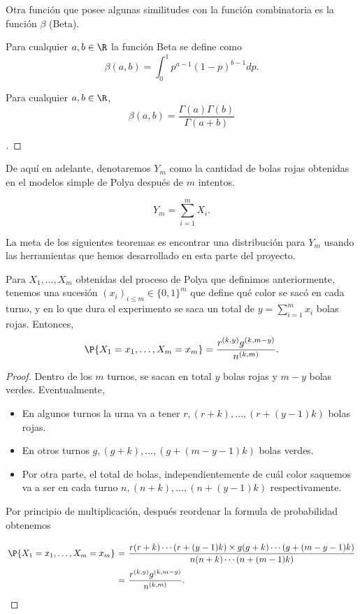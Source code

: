 Otra función que posee algunas similitudes con la función combinatoria es la función $\beta$ (Beta).

\begin{definition} Para cualquier $a,b \in \R$ la función Beta se define como
    \[ \beta(a,b) = \int_0^1 p^{a-1} (1-p)^{b-1} dp. \]
\end{definition}

\begin{theorem} Para cualquier $a,b \in \R$,
    \[ \beta(a,b) = \dfrac{\Gamma(a)\Gamma(b)}{\Gamma(a+b)} \]
\end{theorem}
\begin{proof}[]
    \vspace*{-2em}
\end{proof}

De aquí en adelante, denotaremos $Y_m$ como la cantidad de bolas rojas obtenidas en el modelos simple de Polya después de $m$ intentos.

\begin{definition}
    \[ Y_m = \sum_{i = 1}^{m} X_i. \]
\end{definition}

La meta de los siguientes teoremas es encontrar una distribución para $Y_m$ usando las herramientas que hemos desarrollado en esta parte del proyecto.

\begin{theorem}\label{polya-mass}
    Para $X_1,\ldots, X_m$ obtenidas del proceso de Polya que definimos anteriormente, tenemos una sucesión $(x_i)_{i\leq m} \in \{0,1\}^m$ que define qué color se sacó en cada turno, y en lo que dura el experimento se saca un total de $y = \sum_{i = 1}^m x_i$ bolas rojas. Entonces,
    \[  \P\{X_1 = x_1,\ldots, X_m = x_m\} = \frac{r^{(k,y)} g^{(k,m-y)}}{n^{(k,m)}}. \]
\end{theorem}
\begin{proof} 
    Dentro de los $m$ turnos, se sacan en total $y$ bolas rojas y $m-y$ bolas verdes. Eventualmente, 
    \begin{itemize}
        \item En algunos turnos la urna va a tener $r,(r+k),\ldots,(r+(y-1)k)$ bolas rojas.
        \item En otros turnos $g,(g+k),\ldots,(g+(m-y-1)k)$ bolas verdes.
        \item Por otra parte, el total de bolas, independientemente de cuál color saquemos va a ser en cada turno $n, (n+k), \ldots, (n+(y-1)k)$ respectivamente.
    \end{itemize}
    Por principio de multiplicación, después reordenar la formula de probabilidad obtenemos
    \[ \everymath{\displaystyle}
    \arraycolsep=1.8pt\def\arraystretch{2.5}
    \begin{array}{rcl}
        \P\{X_1 = x_1,\ldots, X_m = x_m\} & = & \frac{r(r+k)\cdots(r+(y-1)k) \times g(g+k)\cdots(g+(m-y-1)k)}{n(n+k)\cdots(n+(m-1)k)}\\
        & = & \frac{r^{(k,y)} g^{(k,m-y)}}{n^{(k,m)}}.
    \end{array}    
     \]
\end{proof}

